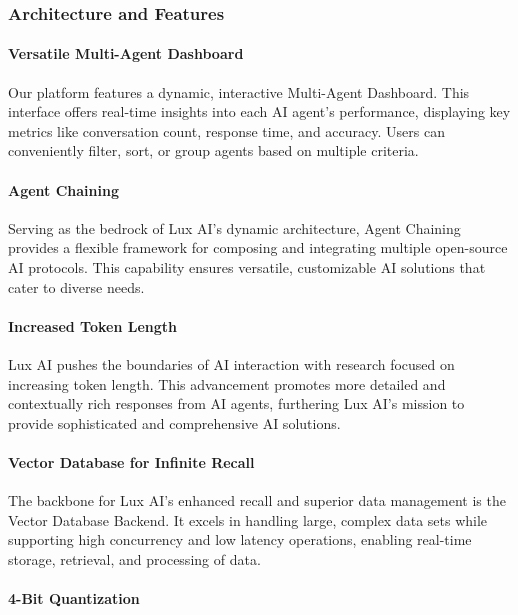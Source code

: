 \documentclass[11pt]{article}
\begin{document}
\subsubsection{Architecture and Features}

\paragraph{Versatile Multi-Agent Dashboard}

Our platform features a dynamic, interactive Multi-Agent Dashboard. This interface offers real-time insights into each AI agent's performance, displaying key metrics like conversation count, response time, and accuracy. Users can conveniently filter, sort, or group agents based on multiple criteria.


\paragraph{Agent Chaining}

Serving as the bedrock of Lux AI's dynamic architecture, Agent Chaining provides a flexible framework for composing and integrating multiple open-source AI protocols. This capability ensures versatile, customizable AI solutions that cater to diverse needs.


\paragraph{Increased Token Length}

Lux AI pushes the boundaries of AI interaction with research focused on increasing token length. This advancement promotes more detailed and contextually rich responses from AI agents, furthering Lux AI's mission to provide sophisticated and comprehensive AI solutions.


\paragraph{Vector Database for Infinite Recall}

The backbone for Lux AI's enhanced recall and superior data management is the Vector Database Backend. It excels in handling large, complex data sets while supporting high concurrency and low latency operations, enabling real-time storage, retrieval, and processing of data.


\paragraph{4-Bit Quantization}
\end{document}
